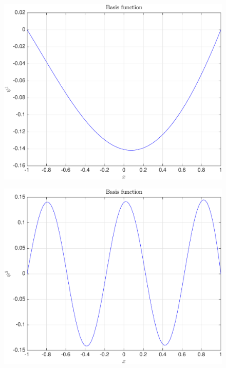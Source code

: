 \documentclass[11pt,a4paper]{article}
\theoremstyle{definition}
\theoremstyle{theorem}
\begin{document}
	\begin{figure}
		\center
		\includegraphics[scale=0.5]{fig7}
		\caption{}
	\end{figure}
	
	\begin{figure}
		\center
		\includegraphics[scale=0.5]{fig8}
		\caption{}
	\end{figure}
	
\end{document}
